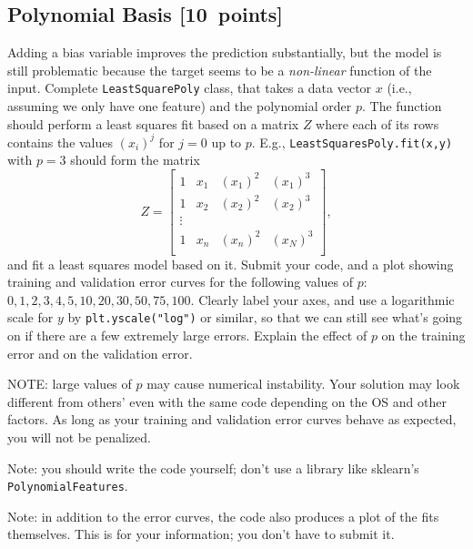 \documentclass{article}
\newcommand{\blu}[1]{{\textcolor{blu}{#1}}}
\let\ask\blu
\newcommand\pts[1]{\textcolor{pointscolour}{[#1~points]}}
\begin{document}
\subsection{Polynomial Basis \pts{10}}

Adding a bias variable improves the prediction substantially, but the model is still problematic because the target seems to be a \emph{non-linear} function of the input.
Complete \texttt{LeastSquarePoly} class, that takes a data vector $x$ (i.e., assuming we only have one feature) and the polynomial order $p$. The function should perform a least squares fit based on a matrix $Z$ where each of its rows contains the values $(x_{i})^j$ for $j=0$ up to $p$. E.g., \texttt{LeastSquaresPoly.fit(x,y)}  with $p = 3$ should form the matrix
\[
Z =
\left[\begin{array}{cccc}
1 & x_1 & (x_1)^2 & (x_1)^3\\
1 & x_2 & (x_2)^2 & (x_2)^3\\
\vdots\\
1 & x_n & (x_n)^2 & (x_N)^3\\
\end{array}
\right],
\]
and fit a least squares model based on it.
\ask{Submit your code, and a plot showing training and validation error curves for the following values of $p$: $0,1,2,3,4,5,10,20,30,50,75,100$. Clearly label your axes, and use a logarithmic scale for $y$} by \texttt{plt.yscale("log")} or similar, so that we can still see what's going on if there are a few extremely large errors. \ask{Explain the effect of $p$ on the training error and on the validation error.}

NOTE: large values of $p$ may cause numerical instability. Your solution may look different from others' even with the same code depending on the OS and other factors. As long as your training and validation error curves behave as expected, you will not be penalized.

Note: you should write the code yourself; don't use a library like sklearn's \texttt{PolynomialFeatures}.

Note: in addition to the error curves, the code also produces a plot of the fits themselves. This is for your information; you don't have to submit it.
\end{document}
